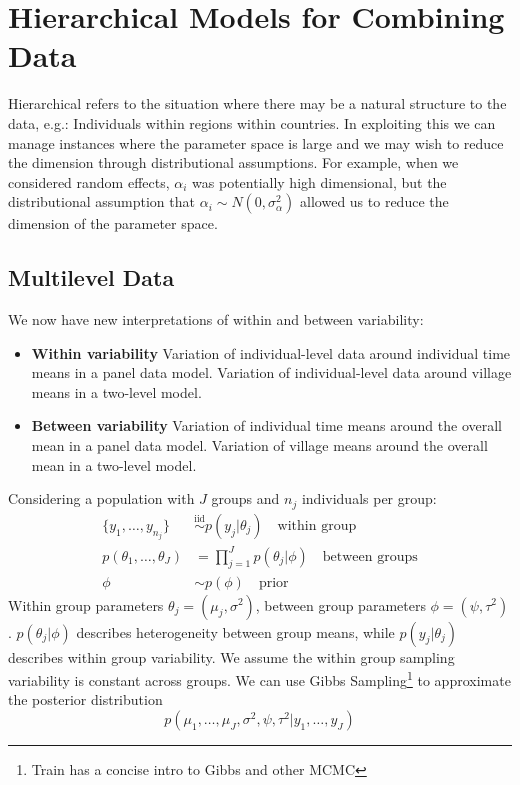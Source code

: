 \documentclass[DIV=14,titlepage=false]{scrreprt}
\begin{document}
\vspace{-10pt}
\setcounter{chapter}{6}


\chapter{Hierarchical Models for Combining Data}
Hierarchical refers to the situation where there may be a natural structure to the data, e.g.: Individuals within regions within countries. In exploiting this we can manage instances where the parameter space is large and we may wish to reduce the dimension through distributional assumptions. For example, when we considered random effects, $\alpha_i$ was potentially high dimensional, but the distributional assumption that $\alpha_i \sim N(0, \sigma^2_\alpha)$ allowed us to reduce the dimension of the parameter space.
\section{Multilevel Data}
We now have new interpretations of within and between variability:
\begin{itemize}
    \item \textbf{Within variability} Variation of individual-level data around individual time means in a panel data model. Variation of individual-level data around village means in a two-level model.
    \item \textbf{Between variability} Variation of individual time means around the overall mean in a panel data model. Variation of village means around the overall mean in a two-level model.
\end{itemize}
Considering a population with $J$ groups and $n_j$ individuals per group:
\begin{align*}
    \{y_1, \ldots, y_{n_j}\} & \overset{\text{iid}}{\sim} p(y_j|\theta_j) \quad \text{within group} \\
    p(\theta_1, \ldots, \theta_J) & = \prod_{j=1}^J p(\theta_j|\phi) \quad \text{between groups}\\
    \phi & \sim p(\phi) \quad \text{prior}
\end{align*}
Within group parameters $\theta_j = (\mu_j, \sigma^2)$, between group parameters $\phi = (\psi, \tau^2)$. $p(\theta_j|\phi)$ describes heterogeneity between group means, while $p(y_j|\theta_j)$ describes within group variability. We assume the within group sampling variability is constant across groups. We can use Gibbs Sampling\footnote{Train has a concise intro to Gibbs and other MCMC} to approximate the posterior distribution\[
    p(\mu_1, \ldots, \mu_J, \sigma^2, \psi, \tau^2|y_1, \ldots, y_J)
\]
\end{document}
